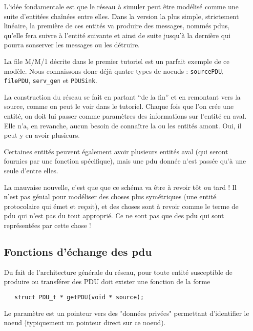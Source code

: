 \documentclass{article}
\begin{document}
   L'idée fondamentale est que le réseau à simuler peut être
modélisé comme une suite d'entitées chaînées entre elles. Dans la
version la plus simple, strictement linéaire, la première de ces
entités va produire des messages, nommés {\sc pdu}s, qu'elle fera
suivre à l'entité suivante et ainsi de suite jusqu'à la dernière qui
pourra sonserver les messages ou les détruire.

   La file M/M/1 décrite dans le premier tutoriel est un parfait
exemple de ce modèle. Nous connaissons donc déjà quatre types de
noeuds : {\tt sourcePDU}, {\tt filePDU}, {\tt serv\_gen} et {\tt PDUSink}.

   La construction du réseau se fait en partant ``de la fin'' et en
remontant vers la source, comme on peut le voir dans le
tutoriel. Chaque fois que l'on crée une entité, on doit lui passer
comme paramètres des informations sur l'entité en aval. Elle n'a, en
revanche, aucun besoin de connaître la ou les entités amont. Oui, il
peut y en avoir plusieurs.

   Certaines entités peuvent également avoir plusieurs entités aval
(qui seront fournies par une fonction spécifique), mais une {\sc pdu}
donnée n'est passée qu'à une seule d'entre elles.

   La mauvaise nouvelle, c'est que que ce schéma va être à revoir tôt
ou tard ! Il n'est pas génial pour modéliser des choses plus
symétriques (une entité protocolaire qui émet et reçoit), et des
choses sont à revoir comme le terme de {\sc pdu} qui n'est pas du tout
approprié. Ce ne sont pas que des {\sc pdu} qui sont représentées par
cette chose !

%
\subsection{Fonctions d'échange des {\sc pdu}}

   Du fait de l'architecture générale du réseau, pour toute entité susceptible
de produire ou transférer des PDU doit exister une fonction de la forme

\begin{verbatim}
   struct PDU_t * getPDU(void * source);
\end{verbatim}

   Le paramètre est un pointeur vers des "données privées" permettant
d'identifier le noeud (typiquement un pointeur direct sur ce noeud).
\end{document}
